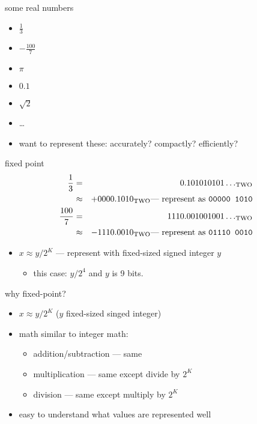 \begin{frame}{some real numbers}
\begin{itemize}
\item $\frac{1}{3}$
\item $-\frac{100}{7}$
\item $\pi$
\item $0.1$
\item $\sqrt{2}$
\item \ldots
\vspace{.5cm}
\item want to represent these: {\small accurately? compactly? efficiently?}
\end{itemize}
\end{frame}

\begin{frame}{fixed point}
\begin{eqnarray*}
\frac{1}{3} &=& 0.101010101\ldots_\text{TWO}  \\\
            &\approx& +0000.1010_\text{TWO} \text{--- represent as {\tt 00000 1010}} \\
\frac{100}{7} &=& 1110.001001001\ldots_\text{TWO}  \\
            &\approx& -1110.0010_\text{TWO} \text{--- represent as {\tt 01110 0010}} \\
\end{eqnarray*}
\begin{itemize}
\item<2-> $x \approx y/2^K$ --- represent with fixed-sized signed integer $y$
\begin{itemize}
    \item this case: $y/2^4$ and $y$ is 9 bits.
\end{itemize}
\end{itemize}
\end{frame}

\begin{frame}{why fixed-point?}
\begin{itemize}
\item $x \approx y/2^K$ ($y$ fixed-sized singed integer)
\item math similar to integer math:
    \begin{itemize}
    \item addition/subtraction --- same
    \item multiplication --- same except divide by $2^K$ 
    \item division --- same except multiply by $2^K$
    \end{itemize}
\item easy to understand what values are represented well
\end{itemize}
\end{frame}

